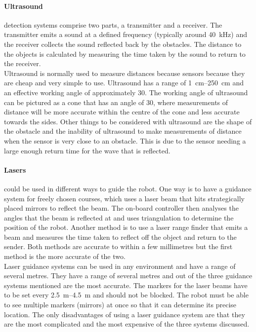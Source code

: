         \paragraph{Ultrasound} detection systems comprise two parts, a transmitter and a receiver. The transmitter emits a sound at a defined frequency (typically around \SI{40}{\kilo\hertz}) and the receiver collects the sound reflected back by the obstacles. The distance to the objects is calculated by measuring the time taken by the sound to return to the receiver.\\
        Ultrasound is normally used to measure distances because sensors because they are cheap and very simple to use. Ultrasound has a range of \SIrange{1}{250}{\centi\meter} and an effective working angle of approximately 30\dg.\cite{ultrasoundrobots} The working angle of ultrasound can be pictured as a cone that has an angle of 30\dg, where measurements of distance will be more accurate within the centre of the cone and less accurate towards the sides. Other things to be considered with ultrasound are the shape of the obstacle and the inability of ultrasound to make measurements of distance when the sensor is very close to an obstacle. This is due to the sensor needing a large enough return time for the wave that is reflected.

        \paragraph{Lasers} could be used in different ways to guide the robot. One way is to have a guidance system for freely chosen courses, which uses a laser beam that hits strategically placed mirrors to reflect the beam. The on-board controller then analyses the angles that the beam is reflected at and uses triangulation to determine the position of the robot. Another method is to use a laser range finder that emits a beam and measures the time taken to reflect off the object and return to the sender. Both methods are accurate to within a few millimetres but the first method is the more accurate of the two.\\
        Laser guidance systems can be used in any environment and have a range of several metres. They have a range of several metres and out of the three guidance systems mentioned are the most accurate. The markers for the laser beams have to be set every \SIrange{2.5}{4.5}{\meter} and should not be blocked. The robot must be able to see multiple markers (mirrors) at once so that it can determine its precise location. The only disadvantages of using a laser guidance system are that they are the most complicated and the most expensive of the three systems discussed.

